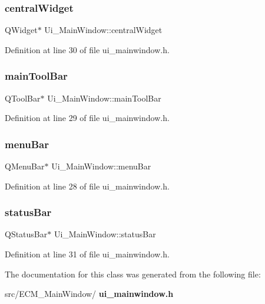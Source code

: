 \subsubsection{central\+Widget}
{\footnotesize\ttfamily Q\+Widget$\ast$ Ui\+\_\+\+Main\+Window\+::central\+Widget}



Definition at line 30 of file ui\+\_\+mainwindow.\+h.

\mbox{\label{class_ui___main_window_a5172877001c8c7b4e0f6de50421867d1}} 
\subsubsection{main\+Tool\+Bar}
{\footnotesize\ttfamily Q\+Tool\+Bar$\ast$ Ui\+\_\+\+Main\+Window\+::main\+Tool\+Bar}



Definition at line 29 of file ui\+\_\+mainwindow.\+h.

\mbox{\label{class_ui___main_window_a2be1c24ec9adfca18e1dcc951931457f}} 
\subsubsection{menu\+Bar}
{\footnotesize\ttfamily Q\+Menu\+Bar$\ast$ Ui\+\_\+\+Main\+Window\+::menu\+Bar}



Definition at line 28 of file ui\+\_\+mainwindow.\+h.

\mbox{\label{class_ui___main_window_a50fa481337604bcc8bf68de18ab16ecd}} 
\subsubsection{status\+Bar}
{\footnotesize\ttfamily Q\+Status\+Bar$\ast$ Ui\+\_\+\+Main\+Window\+::status\+Bar}



Definition at line 31 of file ui\+\_\+mainwindow.\+h.



The documentation for this class was generated from the following file\+:\begin{DoxyCompactItemize}
\item 
src/\+E\+C\+M\+\_\+\+Main\+Window/\textbf{ ui\+\_\+mainwindow.\+h}\end{DoxyCompactItemize}
